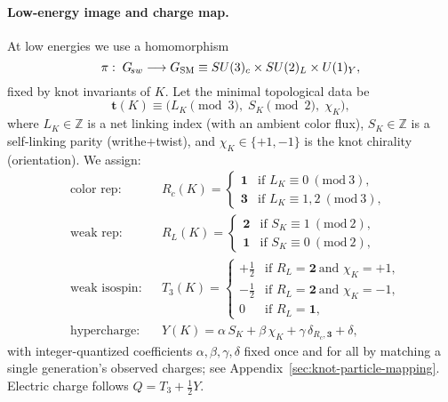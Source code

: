  \paragraph{Low-energy image and charge map.}
 At low energies we use a homomorphism
 \[
 \pi:\; G_{\!sw}\longrightarrow G_{\rm SM}\equiv SU(3)_c\times SU(2)_L\times U(1)_Y,
    \]
    fixed by knot invariants of \(K\).
    Let the minimal topological data be
    \[
        \mathbf{t}(K)\equiv\big(L_K\!\!\!\!\pmod{3},\; S_K\!\!\!\!\pmod{2},\; \chi_K\big),
    \]
    where \(L_K\in\mathbb{Z}\) is a net linking index (with an ambient color flux), \(S_K\in\mathbb{Z}\) is a self-linking parity (writhe+twist), and \(\chi_K\in\{+1,-1\}\) is the knot chirality (orientation).
    We assign:
    \begin{align}
        &\text{color rep:} &&
        R_c(K)=
        \begin{cases}
            \mathbf{1} & \text{if } L_K\equiv 0\ (\mathrm{mod}\ 3),\\
            \mathbf{3} & \text{if } L_K\equiv 1,2\ (\mathrm{mod}\ 3),
        \end{cases}
        \\[2pt]
        &\text{weak rep:} &&
        R_L(K)=
        \begin{cases}
            \mathbf{2} & \text{if } S_K\equiv 1\ (\mathrm{mod}\ 2),\\
            \mathbf{1} & \text{if } S_K\equiv 0\ (\mathrm{mod}\ 2),
        \end{cases}
        \\[2pt]
        &\text{weak isospin:} &&
        T_3(K)=
        \begin{cases}
            +\tfrac{1}{2} & \text{if } R_L=\mathbf{2}\ \text{and }\chi_K=+1,\\
            -\tfrac{1}{2} & \text{if } R_L=\mathbf{2}\ \text{and }\chi_K=-1,\\
            0 & \text{if } R_L=\mathbf{1},
        \end{cases}
        \\[2pt]
        &\text{hypercharge:} &&
        Y(K)=\alpha\,S_K+\beta\,\chi_K+\gamma\,\delta_{R_c,\mathbf{3}}+\delta,
        \label{eq:Y-map}
    \end{align}
    with integer-quantized coefficients \(\alpha,\beta,\gamma, \delta\) fixed once and for all by matching a single generation’s observed charges; see Appendix~\ref{sec:knot-particle-mapping}.
    Electric charge follows \(Q=T_3+\tfrac12 Y\).

